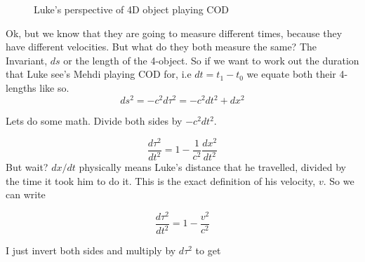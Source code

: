 \begin{figure}[h]
  \centering
{}
\caption{Luke's perspective of 4D object playing COD}
\label{fig:L4d}
\end{figure}

Ok, but we know that they are going to measure different times, because they have different velocities. But what do they both measure the same? The Invariant, $ds$ or the length of the 4-object. So if we want to work out the duration that Luke see's Mehdi playing COD for, i.e $dt = t_1 - t_0$ we equate both their 4-lengths like so. 
\begin{equation}
  ds^2 = -c^2 d\tau^2 = -c^2 dt^2 + dx^2
\end{equation}

Lets do some math. Divide both sides by $-c^2 dt^2$. 

\begin{equation}
  \frac{d\tau^2}{dt^2} = 1  - \frac{1}{c^2} \frac{dx^2}{dt^2}
\end{equation}
But wait? $dx/dt$ physically means Luke's distance that he travelled, divided by the time it took him to do it. This is the exact definition of his velocity, $v$. So we can write

\begin{equation}
  \frac{d\tau^2}{dt^2} = 1  - \frac{v^2}{c^2}
  \label{eq:u0}
\end{equation}

I just invert both sides and multiply by $d\tau^2$ to get

